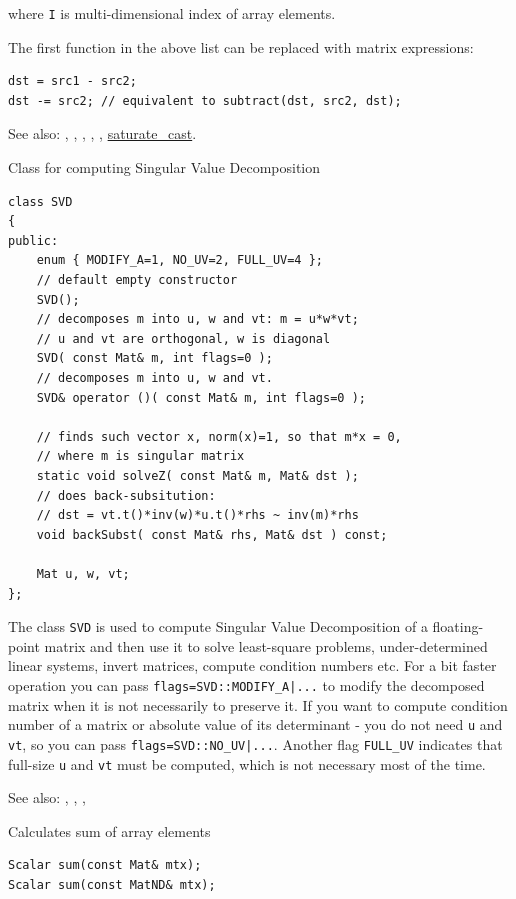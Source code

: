 where \texttt{I} is multi-dimensional index of array elements.

The first function in the above list can be replaced with matrix expressions:
\begin{lstlisting}
dst = src1 - src2;
dst -= src2; // equivalent to subtract(dst, src2, dst);
\end{lstlisting}

See also: , , , ,
, \hyperref[saturatecast]{saturate\_cast}.

\label{SVD}
Class for computing Singular Value Decomposition

\begin{lstlisting}
class SVD
{
public:
    enum { MODIFY_A=1, NO_UV=2, FULL_UV=4 };
    // default empty constructor
    SVD();
    // decomposes m into u, w and vt: m = u*w*vt;
    // u and vt are orthogonal, w is diagonal
    SVD( const Mat& m, int flags=0 );
    // decomposes m into u, w and vt.
    SVD& operator ()( const Mat& m, int flags=0 );

    // finds such vector x, norm(x)=1, so that m*x = 0,
    // where m is singular matrix
    static void solveZ( const Mat& m, Mat& dst );
    // does back-subsitution:
    // dst = vt.t()*inv(w)*u.t()*rhs ~ inv(m)*rhs
    void backSubst( const Mat& rhs, Mat& dst ) const;

    Mat u, w, vt;
};
\end{lstlisting}

The class \texttt{SVD} is used to compute Singular Value Decomposition of a floating-point matrix and then use it to solve least-square problems, under-determined linear systems, invert matrices, compute condition numbers etc.
For a bit faster operation you can pass \texttt{flags=SVD::MODIFY\_A|...} to modify the decomposed matrix when it is not necessarily to preserve it. If you want to compute condition number of a matrix or absolute value of its determinant - you do not need \texttt{u} and \texttt{vt}, so you can pass \texttt{flags=SVD::NO\_UV|...}. Another flag \texttt{FULL\_UV} indicates that full-size \texttt{u} and \texttt{vt} must be computed, which is not necessary most of the time.

See also: , , , 

\label{sum}
Calculates sum of array elements

\begin{lstlisting}
Scalar sum(const Mat& mtx);
Scalar sum(const MatND& mtx);
\end{lstlisting}
\begin{description}
\end{description}

